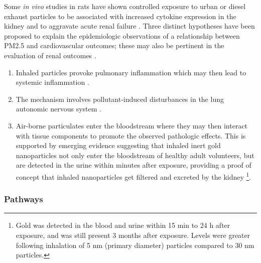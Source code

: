 \documentclass[11pt]{article}
\begin{document}
Some \textit{in vivo} studies in rats have shown controlled exposure to urban or diesel exhaust particles to be associated with increased cytokine expression in the kidney \citep{thomson2013mapping} and to aggravate acute renal failure \citep{nemmar2009diesel}. Three distinct hypotheses have been proposed to explain the epidemiologic observations of a relationship between PM2.5 and cardiovascular outcomes; these may also be pertinent in the evaluation of renal outcomes \citep{bowe2018particulate}.
\begin{enumerate}
    \item Inhaled particles provoke pulmonary inflammation which may then lead to systemic inflammation \citep{chin2014basic}.
    \item The mechanism involves pollutant-induced disturbances in the lung autonomic nervous system \citep{chin2014basic}.
    \item Air-borne particulates enter the bloodstream where they may then interact with tissue components to promote the observed pathologic effects. This is supported by emerging evidence suggesting that inhaled inert gold nanoparticles not only enter the bloodstream of healthy adult volunteers, but are detected in the urine within minutes after exposure, providing a proof of concept that inhaled nanoparticles get filtered and excreted by the kidney \citep{chin2014basic, miller2017inhaled}\footnote{Gold was detected in the blood and urine within 15 min to 24 h after exposure, and was still present 3 months after exposure. Levels were greater following inhalation of 5 nm (primary diameter) particles compared to 30 nm particles.}.
\end{enumerate}

\subsubsection{Pathways}
\end{document}
